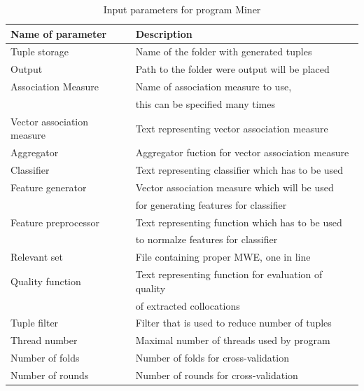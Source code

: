 \begin{table}[t]
    \centering
    \begin{tabular*}{0.9\textwidth}{|l @{\extracolsep{\fill}} l|}
        \hline 
        \textbf{Name of parameter} & \textbf{Description} \\
        \hline
        Tuple storage & Name of the folder with generated tuples \\
        \hline
        Output & Path to the folder were output will be placed \\
        \hline
        Association Measure & Name of association measure to use, \\& this can be specified many times \\
        \hline
        Vector association measure & Text representing vector association measure \\
        \hline
        Aggregator & Aggregator fuction for vector association measure \\
        \hline
        Classifier & Text representing classifier which has to be used \\
        \hline
        Feature generator & Vector association measure which will be used \\& for generating features for classifier \\
        \hline
        Feature preprocessor & Text representing function which has to be used \\& to normalze features for classifier \\
        \hline
        Relevant set & File containing proper MWE, one in line \\
        \hline
        Quality function & Text representing function for evaluation of quality \\& of extracted collocations \\
        \hline
        Tuple filter & Filter that is used to reduce number of tuples \\
        \hline
        Thread number & Maximal number of threads used by program \\
        \hline
        Number of folds & Number of folds for cross-validation \\
        \hline
        Number of rounds & Number of rounds for cross-validation \\
        \hline
    \end{tabular*} 
    \caption{Input parameters for program Miner}
    \label{tbl_workflow1}
\end{table}

